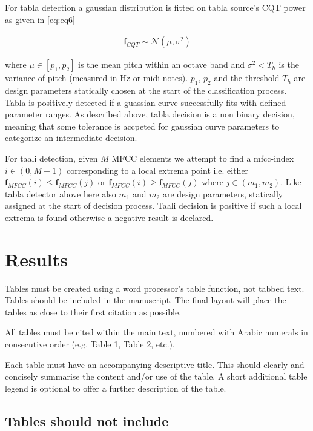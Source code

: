 \documentclass{article}
\begin{document}
For tabla detection a gaussian distribution is fitted on tabla source's CQT power as given in \ref{eq:eq6}

\begin{align}\label{eq:eq8}
\boldsymbol{f}_{CQT} \sim \mathcal{N}(\mu, \sigma^{2})
\end{align}

where $\mu \in [p_{1}, p_{2}]$ is the mean pitch within an octave band and $\sigma^{2} < T_{h}$ is the variance of pitch (measured in Hz or midi-notes). $p_{1}$, $p_{2}$ and the threshold $T_{h}$ are design parameters statically chosen at the start of the classification process. Tabla is positively detected if a guassian curve successfully fits with defined parameter ranges. As described above, tabla decision is a non binary decision, meaning that some tolerance is accpeted for gaussian curve parameters to categorize an intermediate decision.

For taali detection, given $M$ MFCC elements we attempt to find a mfcc-index $i \in (0, M-1)$ corresponding to a local extrema point i.e. either $\boldsymbol{f}_{MFCC}(i) \leq \boldsymbol{f}_{MFCC}(j)$ or $\boldsymbol{f}_{MFCC}(i) \geq \boldsymbol{f}_{MFCC}(j)$ where $j \in (m_{1}, m_{2})$. Like tabla detector above here also $m_{1}$ and $m_{2}$ are design parameters, statically assigned at the start of decision process. Taali decision is positive if such a local extrema is found otherwise a negative result is declared.

\section{Results}\label{sec:result}

Tables must be created using a word processor's table function,
not tabbed text.
Tables should be included in the manuscript.
The final layout will place the tables as close to their first
citation as possible.

All tables must be cited within the main text, numbered with Arabic
numerals in consecutive order (e.g. Table 1, Table 2, etc.).

Each table must have an accompanying descriptive title.
This should clearly and concisely summarise the content and/or
use of the table.
A short additional table legend is optional to offer a further
description of the table.

\subsection{Tables should not include}
\end{document}
